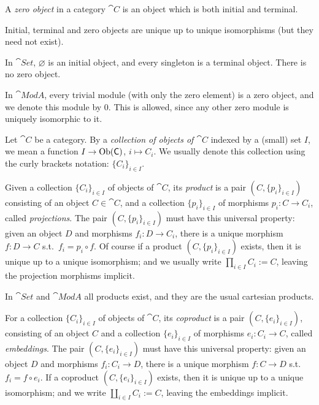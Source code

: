 \begin{dfn}
A {\em zero object} in a category $\cat{C}$ is an object which is both initial
and terminal. 
\end{dfn}

Initial, terminal and zero objects are unique up to unique isomorphisms (but
they need not exist).

\begin{exa}
In $\cat{Set}$, $\varnothing$ is an initial object, and every singleton is a
terminal object. There is no zero object.
\end{exa}

\begin{exa}
In $\cat{Mod} A$, every trivial module (with only the zero element) is a 
zero object, and we denote this module by $0$. This is allowed, since any other
zero module is uniquely isomorphic to it.  
\end{exa}


Let $\cat{C}$ be a category. By a {\em collection of objects of $\cat{C}$} 
indexed by a (small) set $I$, we mean a function $I \to \operatorname{Ob}(\operatorname{\mathsf{C}})$,
$i \mapsto C_i$. We usually denote this collection using the curly brackets 
notation: $\{ C_i \}_{i \in I}$.

Given a collection $\{ C_i \}_{i \in I}$ of objects of $\cat{C}$, 
its {\em product} is a pair $(C, \{ p_i \}_{i \in I})$
consisting of an object $C \in \cat{C}$, and a collection
$\{ p_i \}_{i \in I}$ of morphisms $p_i : C \to C_i$, called 
{\em projections}. The pair $(C, \{ p_i \}_{i \in I})$ 
must have this universal property: given an object $D$ and morphisms 
$f_i : D \to C_i$, there is a unique morphism $f : D \to C$  s.t.\ 
$f_i = p_i \circ f$. Of course if a product
$(C, \{ p_i \}_{i \in I})$ exists, then it is unique up to a
unique isomorphism; and we usually write
$\prod_{i \in I} C_i := C$, leaving the projection morphisms implicit. 

\begin{exa}
In $\cat{Set}$ and $\cat{Mod} A$ all products exist,
and they are the usual cartesian products. 
\end{exa}

For a collection $\{ C_i \}_{i \in I}$ of objects
of $\cat{C}$, its {\em coproduct} is a pair $(C, \{ e_i \}_{i \in I})$,
consisting of an object $C$ and a collection $\{ e_i \}_{i \in I}$
of morphisms $e_i : C_i \to C$, called {\em embeddings}. 
The pair $(C, \{ e_i \}_{i \in I})$ 
must have this universal property: given an object $D$ and morphisms 
$f_i : C_i \to D$, there is a unique morphism $f : C \to D$  s.t.\ 
$f_i = f \circ e_i$. If a coproduct
$(C, \{ e_i \}_{i \in I})$ exists, then it is unique up to a
unique isomorphism; and we write
$\coprod_{i \in I} C_i := C$,  leaving the embeddings implicit. 

